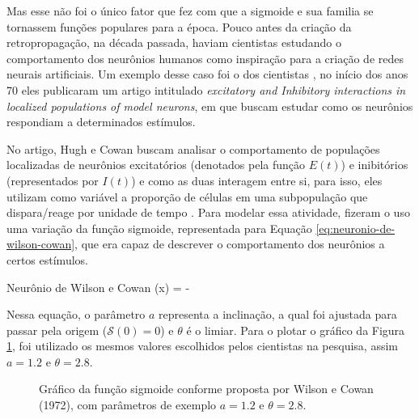 Mas esse não foi o único fator que fez com que a sigmoide e sua familia se tornassem funções populares para a época. Pouco antes da criação da retropropagação, na década passada, haviam cientistas estudando o comportamento dos neurônios humanos como inspiração para a criação de redes neurais artificiais. Um exemplo desse caso foi o dos cientistas \textcite{SigmoidWilsonCowan}, no início dos anos 70 eles publicaram um artigo intitulado \textit{excitatory and Inhibitory interactions in localized populations of model neurons}, em que buscam estudar como os neurônios respondiam a determinados estímulos.

No artigo, Hugh e Cowan buscam analisar o comportamento de populações localizadas de neurônios excitatórios (denotados pela função $E(t)$) e inibitórios (representados por $I(t)$) e como as duas interagem entre si, para isso, eles utilizam como variável a proporção de células em uma subpopulação que dispara/reage por unidade de tempo \parencite{SigmoidWilsonCowan}. Para modelar essa atividade, \textcite{SigmoidWilsonCowan} fizeram o uso uma variação da função sigmoide, representada para Equação \ref{eq:neuronio-de-wilson-cowan}, que era capaz de descrever o comportamento dos neurônios a certos estímulos.

\begin{equacaodestaque}{Neurônio de Wilson e Cowan}
    (x) =  - 
    \label{eq:neuronio-de-wilson-cowan}
\end{equacaodestaque}


Nessa equação, o parâmetro $a$ representa a inclinação, a qual foi ajustada para passar pela origem ($\mathcal{S}(0) = 0$) e $\theta$ 
é o limiar. Para o plotar o gráfico da Figura \ref{fig:sigmoide-wilson-e-cowan}, foi utilizado os mesmos valores escolhidos pelos cientistas na pesquisa, assim $a = 1.2$ e $\theta = 2.8$.

\begin{figure}[h!]


    \centering
    \caption{Gráfico da função sigmoide conforme proposta por Wilson e Cowan (1972), com parâmetros de exemplo $a=1.2$ e $\theta=2.8$.}
    \label{fig:sigmoide-wilson-e-cowan}
\end{figure}

